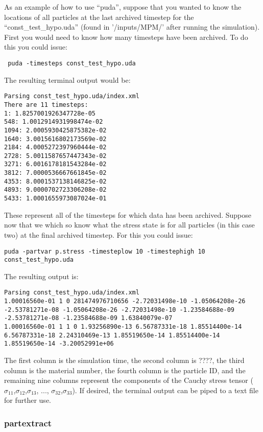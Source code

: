 As an example of how to use ``puda'', suppose that you wanted to know the locations of all particles at the last archived timestep for the ``const\_test\_hypo.uda'' (found in '/inputs/MPM/' after running the simulation).  First you would need to know how many timesteps have been archived.  To do this you could issue:

\begin{verbatim}
 puda -timesteps const_test_hypo.uda
\end{verbatim}
The resulting terminal output would be:
\begin{verbatim}
Parsing const_test_hypo.uda/index.xml
There are 11 timesteps:
1: 1.8257001926347728e-05
548: 1.0012914931998474e-02
1094: 2.0005930425875382e-02
1640: 3.0015616802173569e-02
2184: 4.0005272397960444e-02
2728: 5.0011587657447343e-02
3271: 6.0016178181543284e-02
3812: 7.0000536667661845e-02
4353: 8.0001537138146825e-02
4893: 9.0000702723306208e-02
5433: 1.0001655973087024e-01
\end{verbatim}

These represent all of the timesteps for which data has been archived.  Suppose now that we which so know what the stress state is for all particles (in this case two) at the final archived timestep.  For this you could issue:

\begin{verbatim}
puda -partvar p.stress -timesteplow 10 -timestephigh 10 const_test_hypo.uda
\end{verbatim}

The resulting output is:

\begin{verbatim}
Parsing const_test_hypo.uda/index.xml
1.00016560e-01 1 0 281474976710656 -2.72031498e-10 -1.05064208e-26 -2.53781271e-08 -1.05064208e-26 -2.72031498e-10 -1.23584688e-09 -2.53781271e-08 -1.23584688e-09 1.63840079e-07
1.00016560e-01 1 1 0 1.93256890e-13 6.56787331e-18 1.85514400e-14 6.56787331e-18 2.24310469e-13 1.85519650e-14 1.85514400e-14 1.85519650e-14 -3.20052991e+06
\end{verbatim}

The first column is the simulation time, the second column is ????, the third column is the material number, the fourth column is the particle ID, and the remaining nine columns represent the components of the Cauchy stress tensor ($ \sigma_{11}$,$\sigma_{12}$,$\sigma_{13}$, ..., $\sigma_{32}$,$\sigma_{33}$).  If desired, the terminal output can be piped to a text file for further use.


\subsubsection{partextract}

